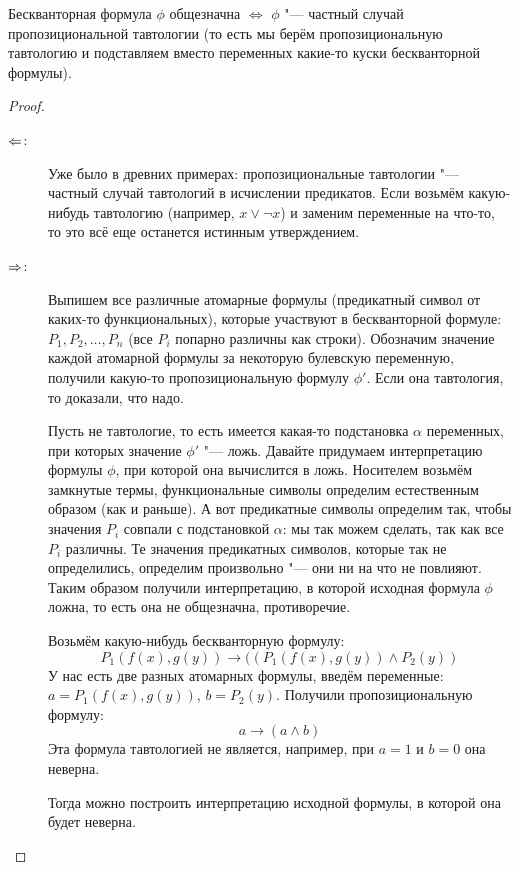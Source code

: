\begin{theorem}
	Бескванторная формула $\phi$ общезначна $\iff$ $\phi$ "--- частный случай
	пропозициональной тавтологии (то есть мы берём пропозициональную тавтологию
	и подставляем вместо переменных какие-то куски бескванторной формулы).
\end{theorem}
\begin{proof}
	\begin{description}
		\item[$\Leftarrow$:]
			Уже было в древних примерах: пропозициональные тавтологии "--- частный случай тавтологий в исчислении предикатов.
			Если возьмём какую-нибудь тавтологию (например, $x \lor \lnot x$) и заменим переменные на что-то,
			то это всё еще останется истинным утверждением.
		\item[$\Rightarrow$:]
			Выпишем все различные атомарные формулы (предикатный символ от каких-то функциональных),
			которые участвуют в бескванторной формуле: $P_1, P_2, \dots, P_n$ (все $P_i$ попарно различны как строки).
			Обозначим значение каждой атомарной формулы за некоторую булевскую переменную, получили
			какую-то пропозициональную формулу $\phi'$.
			Если она тавтология, то доказали, что надо.

			Пусть не тавтологие, то есть имеется какая-то подстановка $\alpha$ переменных, при которых
			значение $\phi'$ "--- ложь.
			Давайте придумаем интерпретацию формулы $\phi$, при которой она вычислится в ложь.
			Носителем возьмём замкнутые термы, функциональные символы определим естественным образом
			(как и раньше).
			А вот предикатные символы определим так, чтобы значения $P_i$ совпали с подстановкой
			$\alpha$: мы так можем сделать, так как все $P_i$ различны.
			Те значения предикатных символов, которые так не определились, определим произвольно "--- они ни на что не повлияют.
			Таким образом получили интерпретацию, в которой исходная формула $\phi$ ложна, то есть она не общезначна, противоречие.

			\begin{exmp}
				Возьмём какую-нибудь бескванторную формулу:
				\[ P_1(f(x), g(y)) \to ((P_1(f(x), g(y)) \land P_2(y)) \]
				У нас есть две разных атомарных формулы, введём переменные: $a=P_1(f(x), g(y))$, $b=P_2(y)$.
				Получили пропозициональную формулу:
				\[ a \to (a \land b) \]
				Эта формула тавтологией не является, например, при $a=1$ и $b=0$ она неверна.

				Тогда можно построить интерпретацию исходной формулы, в которой она будет неверна.
			\end{exmp}
	\end{description}
\end{proof}

